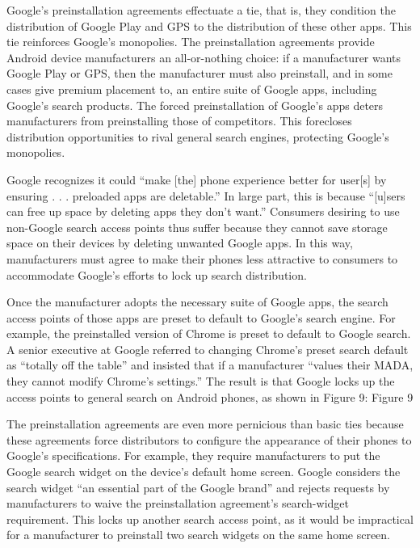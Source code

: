\documentclass[11pt,b5paper]{scrartcl}
\begin{document}

Google’s preinstallation agreements effectuate a tie, that is, they condition the
distribution of Google Play and GPS to the distribution of these other apps. This tie reinforces
Google’s monopolies. The preinstallation agreements provide Android device manufacturers an
all-or-nothing choice: if a manufacturer wants Google Play or GPS, then the manufacturer must
also preinstall, and in some cases give premium placement to, an entire suite of Google apps,
including Google’s search products. The forced preinstallation of Google’s apps deters
manufacturers from preinstalling those of competitors. This forecloses distribution opportunities
to rival general search engines, protecting Google’s monopolies.


Google recognizes it could “make [the] phone experience better for user[s] by
ensuring . . . preloaded apps are deletable.” In large part, this is because “[u]sers can free up
space by deleting apps they don’t want.” Consumers desiring to use non-Google search access
points thus suffer because they cannot save storage space on their devices by deleting unwanted
Google apps. In this way, manufacturers must agree to make their phones less attractive to
consumers to accommodate Google’s efforts to lock up search distribution.


Once the manufacturer adopts the necessary suite of Google apps, the search
access points of those apps are preset to default to Google’s search engine. For example, the
preinstalled version of Chrome is preset to default to Google search. A senior executive at
Google referred to changing Chrome’s preset search default as “totally off the table” and insisted
that if a manufacturer “values their MADA, they cannot modify Chrome’s settings.” The result is
that Google locks up the access points to general search on Android phones, as shown in
Figure 9:
Figure 9


The preinstallation agreements are even more pernicious than basic ties because
these agreements force distributors to configure the appearance of their phones to Google’s
specifications. For example, they require manufacturers to put the Google search widget on the
device’s default home screen. Google considers the search widget “an essential part of the
Google brand” and rejects requests by manufacturers to waive the preinstallation agreement’s
search-widget requirement. This locks up another search access point, as it would be impractical
for a manufacturer to preinstall two search widgets on the same home screen.
\end{document}
